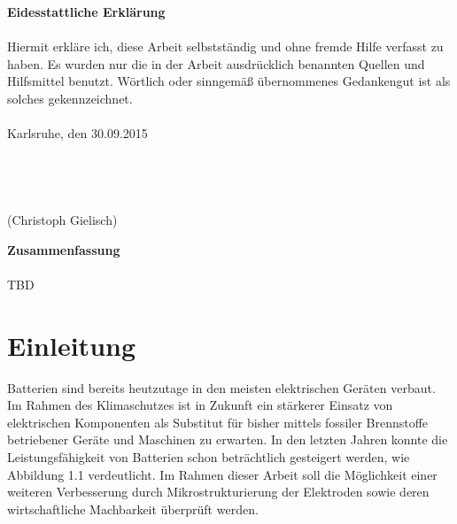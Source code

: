 \documentclass[a4paper, 11pt, headsepline,footsepline,twoside,abstract]{scrbook}
\begin{document}
\cleardoubleemptypage
\setcounter{page}{1}
\textbf{\Large{Eidesstattliche Erklärung}}
\\\\
Hiermit erkläre ich, diese Arbeit selbstständig und ohne fremde Hilfe verfasst zu haben. Es wurden nur die in der Arbeit ausdrücklich benannten Quellen und Hilfsmittel benutzt. Wörtlich oder sinngemäß übernommenes Gedankengut ist als solches gekennzeichnet.
\\\\
Karlsruhe, den 30.09.2015
\\\\
\\\\
\\
(Christoph Gielisch) 
 
\newpage

\setcounter{page}{1}
\textbf{\Large{Zusammenfassung}}
\\\\
TBD
\pagestyle{toc}
\renewcommand*{\chapterpagestyle}{toc} %
\tableofcontents
{} 
\newpage
\cleardoubleemptypage
\pagestyle{normal}
\renewcommand*{\chapterpagestyle}{plain}
\setcounter{page}{1}
\chapter{Einleitung}
Batterien sind bereits heutzutage in den meisten elektrischen Geräten verbaut. Im Rahmen des Klimaschutzes ist in Zukunft ein stärkerer Einsatz von elektrischen Komponenten als Substitut für bisher mittels fossiler Brennstoffe betriebener Geräte und Maschinen zu erwarten. In den letzten Jahren konnte die Leistungsfähigkeit von Batterien schon beträchtlich gesteigert werden, wie Abbildung 1.1 verdeutlicht. Im Rahmen dieser Arbeit soll die Möglichkeit einer weiteren Verbesserung durch Mikrostrukturierung der Elektroden sowie deren wirtschaftliche Machbarkeit überprüft werden.
\end{document}

